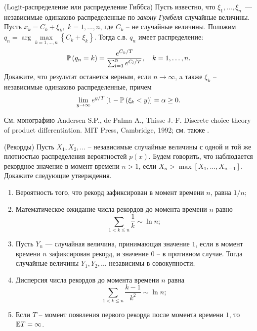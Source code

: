 \begin{problem}\Star(Logit-распределение или распределение Гиббса)
\label{gibbs}
Пусть известно, что $\xi_{1} ,\ldots,\xi_{n}$~--- независимые одинаково распределенные по \textit{закону Гумбеля} случайные величины. Пусть  $x_{k} =C_{k} +\xi _{k} ,$ $k=1,...,n$, где $C_{k} $ -- не случайные величины. Положим $q_n=\arg \mathop{\max }\limits_{k=1,\ldots,n} \left\{C_{k} +\xi _{k} \right\}$. Тогда с.в. $q_n$ имеет распределение:
\[\PR\left(q_n=k\right)=\frac{e^{{C_{k} \mathord{\left/ {\vphantom {C_{k}  T}} \right. \kern-\nulldelimiterspace} T} } }{\sum _{l=1}^{n}e^{{C_{l} \mathord{\left/ {\vphantom {C_{l}  T}} \right. \kern-\nulldelimiterspace} T} }  } , \quad k=1,\ldots,n.\] 
Докажите, что результат останется верным, если $n \to \infty$, a также $\xi_k$ -- независимые одинаково распределенные, причем 
\[
\mathop{\lim }\limits_{y\to \infty } e^{{y\mathord{\left/ {\vphantom {y T}} \right. \kern-\nulldelimiterspace} T} } \left[1-\PR\left(\xi _{k} <y\right)\right]=\alpha \geq 0. 
\]
\end{problem}
\begin{remark}
См. монографию Andersen S.P., de Palma A., Thisse J.-F. Discrete choice theory of product differentiation. MIT Press, Cambridge, 1992; см. также \cite{222}.
\end{remark}


\begin{problem}(Рекорды)
Пусть $X_1 ,X_2 ,\ldots $ -- независимые 
случайные величины с одной и той же плотностью распределения вероятностей 
$p(x)$. Будем говорить, что наблюдается рекордное значение в момент времени 
$n>1$, если $X_n >\max \left[ {X_1 ,...,X_{n-1} } \right]$. Докажите 
следующие утверждения.

\begin{enumerate}
\item Вероятность того, что рекорд зафиксирован в момент времени $n$, 
равна $1/n$;

\item Математическое ожидание числа рекордов до момента времени $n$ 
равно 
\[
\sum\limits_{1<k\le n} {\frac{1}{k}} \sim \ln n;
\]

\item Пусть $Y_n $ --- случайная величина, принимающая значение $1$, если 
в момент времени $n$ зафиксирован рекорд, и значение $0$ -- в противном случае. 
Тогда случайные величины $Y_1 ,Y_2 ,\ldots$ независимы в совокупности;

\item Дисперсия числа рекордов до момента времени $n$ равна
\[
\sum\limits_{1<k\le n} {\frac{k-1}{k^2}} \sim \ln n;
\]

\item Если $T$ -- момент появления первого рекорда после момента времени $1$, то $\mathrm{{\mathbb E}} T= \infty$.
\end{enumerate}
\end{problem}

